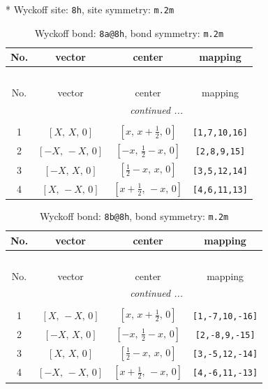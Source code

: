 \documentclass[fleqn,8pt]{jsarticle}
\begin{document}
* Wyckoff site: {\tt 8h}, site symmetry: {\tt m.2m}
\renewcommand{\arraystretch}{1.2}
\begin{longtable}{cccc}
\caption{Wyckoff bond: {\tt 8a@8h}, bond symmetry: {\tt m.2m}}
 \\
 \hline \hline
No. & vector & center & mapping \\ \hline \endfirsthead

\multicolumn{3}{l}{\tablename\ \thetable{}} \\
 \hline \hline
No. & vector & center & mapping \\ \hline \endhead

 \hline \hline
\multicolumn{3}{r}{\footnotesize\it continued ...} \\ \endfoot

 \hline \hline
\multicolumn{3}{r}{} \\ \endlastfoot

1 & $\left[ X,\, X,\, 0 \right]$ & $\left[ x,\, x + \frac{1}{2},\, 0 \right]$ & {\tt [1,7,10,16]} \\ \hline
2 & $\left[ - X,\, - X,\, 0 \right]$ & $\left[ - x,\, \frac{1}{2} - x,\, 0 \right]$ & {\tt [2,8,9,15]} \\ \hline
3 & $\left[ - X,\, X,\, 0 \right]$ & $\left[ \frac{1}{2} - x,\, x,\, 0 \right]$ & {\tt [3,5,12,14]} \\ \hline
4 & $\left[ X,\, - X,\, 0 \right]$ & $\left[ x + \frac{1}{2},\, - x,\, 0 \right]$ & {\tt [4,6,11,13]} \\
\end{longtable}
\renewcommand{\arraystretch}{1.2}
\begin{longtable}{cccc}
\caption{Wyckoff bond: {\tt 8b@8h}, bond symmetry: {\tt m.2m}}
 \\
 \hline \hline
No. & vector & center & mapping \\ \hline \endfirsthead

\multicolumn{3}{l}{\tablename\ \thetable{}} \\
 \hline \hline
No. & vector & center & mapping \\ \hline \endhead

 \hline \hline
\multicolumn{3}{r}{\footnotesize\it continued ...} \\ \endfoot

 \hline \hline
\multicolumn{3}{r}{} \\ \endlastfoot

1 & $\left[ X,\, - X,\, 0 \right]$ & $\left[ x,\, x + \frac{1}{2},\, 0 \right]$ & {\tt [1,-7,10,-16]} \\ \hline
2 & $\left[ - X,\, X,\, 0 \right]$ & $\left[ - x,\, \frac{1}{2} - x,\, 0 \right]$ & {\tt [2,-8,9,-15]} \\ \hline
3 & $\left[ X,\, X,\, 0 \right]$ & $\left[ \frac{1}{2} - x,\, x,\, 0 \right]$ & {\tt [3,-5,12,-14]} \\ \hline
4 & $\left[ - X,\, - X,\, 0 \right]$ & $\left[ x + \frac{1}{2},\, - x,\, 0 \right]$ & {\tt [4,-6,11,-13]} \\
\end{longtable}
\end{document}
